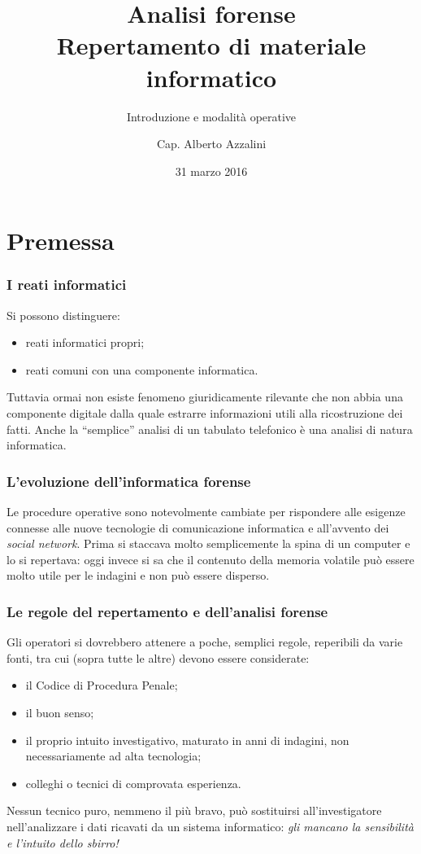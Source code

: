 \documentclass[11pt]{beamer}
\author{Cap. Alberto Azzalini}
\title[Analisi Forense]{Analisi forense\\Repertamento di materiale informatico}
\subtitle{Introduzione e modalità operative}
\institute{Compagnia Carabieri di Vipiteno}
\date{31 marzo 2016}
\begin{document}
	\maketitle
	
	
	\section{Premessa}
	\begin{frame}
		\frametitle{I reati informatici}
		Si possono distinguere:
		\begin{itemize}
			\item reati informatici propri;
			\item reati comuni con una componente informatica.
		\end{itemize}  
				
		Tuttavia ormai non esiste fenomeno giuridicamente rilevante che non abbia una componente digitale dalla quale estrarre informazioni utili alla ricostruzione dei fatti.
		\vfill
		Anche la ``semplice'' analisi di un tabulato telefonico è una analisi di natura informatica.
				
	\end{frame}
	
	\begin{frame}
		\frametitle{L'evoluzione dell'informatica forense}
			Le procedure operative sono notevolmente cambiate per rispondere alle esigenze connesse alle nuove tecnologie di comunicazione informatica e all'avvento dei \textit{social network}.
			\vfill
			Prima si staccava molto semplicemente la spina di un computer e lo si repertava: oggi invece si sa che il contenuto della memoria volatile può essere molto utile per le indagini e non può essere disperso.
	\end{frame}
	
	\begin{frame}
		\frametitle{Le regole del repertamento e dell'analisi forense}
		Gli operatori si dovrebbero attenere a poche, semplici regole, reperibili da varie fonti, tra cui (sopra tutte le altre) devono essere considerate:
		\begin{itemize}
			\item il Codice di Procedura Penale;
			\item il buon senso;
			\item il proprio intuito investigativo, maturato in anni di indagini, non necessariamente ad alta tecnologia;
			\item colleghi o tecnici di comprovata esperienza.
		\end{itemize}
		\vfill
		Nessun tecnico puro, nemmeno il più bravo, può sostituirsi all'investigatore nell'analizzare i dati ricavati da un sistema informatico: \textit{gli mancano la sensibilità e l'intuito dello sbirro!}
		
	\end{frame}
	
\end{document}
